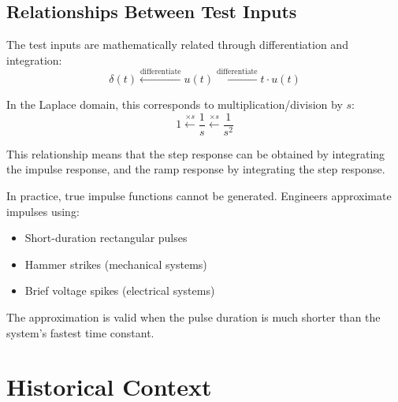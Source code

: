 \subsection{Relationships Between Test Inputs}

The test inputs are mathematically related through differentiation and integration:
\begin{equation}
\delta(t) \xleftarrow{\text{differentiate}} u(t) \xleftarrow{\text{differentiate}} t \cdot u(t)
\end{equation}

In the Laplace domain, this corresponds to multiplication/division by $s$:
\begin{equation}
1 \xleftarrow{\times s} \frac{1}{s} \xleftarrow{\times s} \frac{1}{s^2}
\end{equation}

This relationship means that the step response can be obtained by integrating the impulse response, and the ramp response by integrating the step response.

\begin{practicalbox}[title=Practical Implementation]
In practice, true impulse functions cannot be generated. Engineers approximate impulses using:
\begin{itemize}
    \item Short-duration rectangular pulses
    \item Hammer strikes (mechanical systems)
    \item Brief voltage spikes (electrical systems)
\end{itemize}
The approximation is valid when the pulse duration is much shorter than the system's fastest time constant.
\end{practicalbox}

\section{Historical Context}
\label{sec:history}

